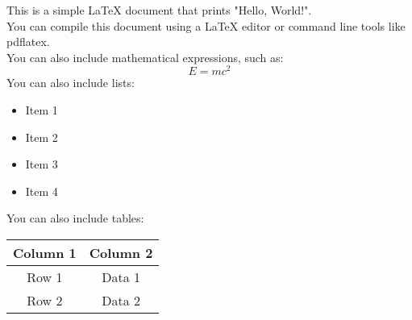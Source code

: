 \documentclass{article}
\begin{document}
This is a simple LaTeX document that prints "Hello, World!".\\
You can compile this document using a LaTeX editor or command line tools like pdflatex.\\
You can also include mathematical expressions, such as:\\
\[
E = mc^2
\]
You can also include lists:
\begin{itemize}
    \item Item 1
    \item Item 2
    \item Item 3
    \item Item 4
\end{itemize}
You can also include tables:
\begin{tabular}{|c|c|}
    \hline
    Column 1 & Column 2 \\
    \hline
    Row 1 & Data 1 \\
    Row 2 & Data 2 \\
    \hline
\end{tabular}
\end{document}
